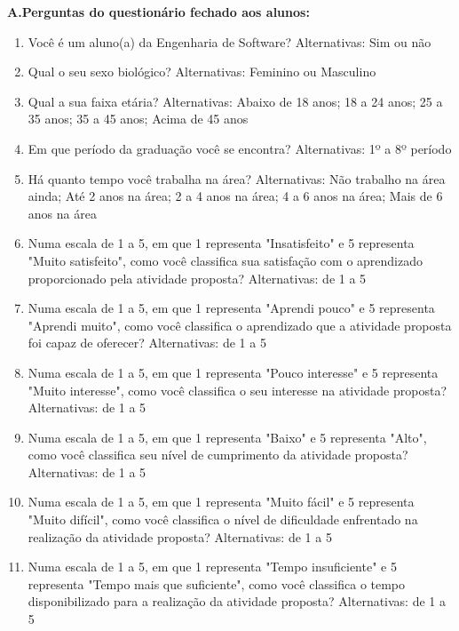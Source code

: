 \textbf{A.\quad Perguntas do questionário fechado aos alunos:}
\begin{enumerate}
    \item Você é um aluno(a) da Engenharia de Software?
    Alternativas: Sim ou não
    
    \item Qual o seu sexo biológico?
    Alternativas: Feminino ou Masculino
    
    \item Qual a sua faixa etária?
    Alternativas: Abaixo de 18 anos; 18 a 24 anos; 25 a 35 anos; 35 a 45 anos; Acima de 45 anos
    
    \item Em que período da graduação você se encontra? 
    Alternativas: 1º a 8º período
    
    \item Há quanto tempo você trabalha na área?
    Alternativas: Não trabalho na área ainda; Até 2 anos na área; 2 a 4 anos na área; 4 a 6 anos na área; Mais de 6 anos na área

    \item Numa escala de 1 a 5, em que 1 representa "Insatisfeito" e 5 representa "Muito satisfeito", como você classifica sua satisfação com o aprendizado proporcionado pela atividade proposta?
    Alternativas: de 1 a 5
    
    \item Numa escala de 1 a 5, em que 1 representa "Aprendi pouco" e 5 representa "Aprendi muito", como você classifica o aprendizado que a atividade proposta foi capaz de oferecer?
    Alternativas: de 1 a 5
    
    \item Numa escala de 1 a 5, em que 1 representa "Pouco interesse" e 5 representa "Muito interesse", como você classifica o seu interesse na atividade proposta?
    Alternativas: de 1 a 5
    
    \item Numa escala de 1 a 5, em que 1 representa "Baixo" e 5 representa "Alto", como você classifica seu nível de cumprimento da atividade proposta?
    Alternativas: de 1 a 5
    
    \item Numa escala de 1 a 5, em que 1 representa "Muito fácil" e 5 representa "Muito difícil", como você classifica o nível de dificuldade enfrentado na realização da atividade proposta?
    Alternativas: de 1 a 5
    
    \item Numa escala de 1 a 5, em que 1 representa "Tempo insuficiente" e 5 representa "Tempo mais que suficiente", como você classifica o tempo disponibilizado para a realização da atividade proposta?
    Alternativas: de 1 a 5
    

\end{enumerate}
